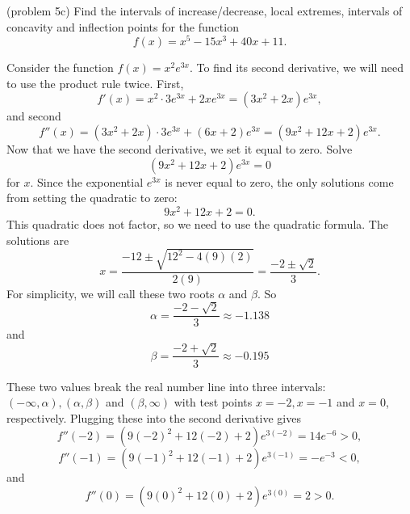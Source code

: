 \documentclass{ximera}
\begin{document}
\begin{problem}(problem 5c) Find the intervals of increase/decrease, local extremes, intervals of concavity and inflection points for the function
\[
f(x) = x^5 - 15x^3 + 40x + 11.
\]
\end{problem}


\begin{example}[example 6]
Consider the function $f(x) = x^2e^{3x}$.  To find its second derivative, 
we will need to use the product rule twice. First, 
\[f'(x) = x^2 \cdot 3e^{3x} + 2xe^{3x} = (3x^2 + 2x)e^{3x},\]
and second
\[f''(x) = (3x^2 + 2x)\cdot 3e^{3x} + (6x + 2)e^{3x} = (9x^2 + 12x + 2)e^{3x}.\]
Now that we have the second derivative, we set it equal to zero.  Solve
\[(9x^2 + 12x + 2)e^{3x}=0\]
for $x$.
Since the exponential $e^{3x}$ is never equal to zero, the only solutions come from setting the quadratic to zero:
\[9x^2 + 12x + 2=0.\]
This quadratic does not factor, so we need to use the quadratic formula.
The solutions are 
\[x = \frac{-12 \pm \sqrt{12^2 - 4(9)(2)}}{2(9)} = \frac{-2 \pm \sqrt{2}}{3}.\]
For simplicity, we will call these two roots $\alpha$ and $\beta$.
So 
\[\alpha = \frac{-2 - \sqrt{2}}{3} \approx -1.138\]
and
\[\beta = \frac{-2 + \sqrt{2}}{3} \approx -0.195\]

These two values break the real number line into three intervals: $(-\infty, \alpha), 
(\alpha, \beta)$ and $(\beta, \infty)$ with test points
$x = -2, x = -1$ and $x = 0$, respectively.
Plugging these into the second derivative gives
\[f''(-2) = (9(-2)^2 + 12(-2) + 2)e^{3(-2)} = 14e^{-6} > 0,\]
\[f''(-1) = (9(-1)^2 + 12(-1) + 2)e^{3(-1)} = -e^{-3} < 0,\]
and
\[f''(0) = (9(0)^2 + 12(0) + 2)e^{3(0)} = 2 > 0.\]







\begin{image}
\end{image}
\end{example}
\end{document}
